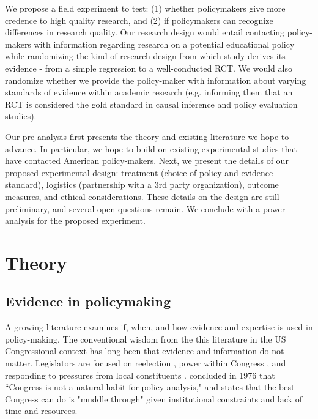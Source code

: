 \documentclass[12pt,final,fleqn]{article}
\theoremstyle{plain}
\begin{document}
We propose a field experiment to test: (1) whether policymakers give more credence to high quality research, and (2) if policymakers can recognize differences in research quality. Our research design would entail contacting policy-makers with information regarding research on a potential educational policy while randomizing the kind of research design from which study derives its evidence - from a simple regression to a well-conducted RCT. We would also randomize whether we provide the policy-maker with information about varying standards of evidence within academic research (e.g. informing them that an RCT is considered the gold standard in causal inference and policy evaluation studies). 

Our pre-analysis first presents the theory and existing literature we hope to advance. In particular, we hope to build on existing experimental studies that have contacted American policy-makers. Next, we present the details of our proposed experimental design: treatment (choice of policy and evidence standard), logistics (partnership with a 3rd party organization), outcome measures, and ethical considerations. These details on the design are still preliminary, and several open questions remain. We conclude with a power analysis for the proposed experiment.


\section{Theory} \label{sec:Theory}
\subsection{Evidence in policymaking}  \label{sec: evidence}

A growing literature examines if, when, and how evidence and expertise is used in policy-making. The conventional wisdom from the this literature in the US Congressional context has long been that evidence and information do not matter. Legislators are focused on reelection \citep{mayhew1974congress}, power within Congress \citep{fenno1973congressmen}, and responding to pressures from local constituents \citep{fenno2002home}. \citet{schick1976supply} concluded in 1976 that ``Congress is not a natural habit for policy analysis," and \citet{lindblom2018science} states that the best Congress can do is "muddle through" given institutional constraints and lack of time and resources. 
\end{document}
